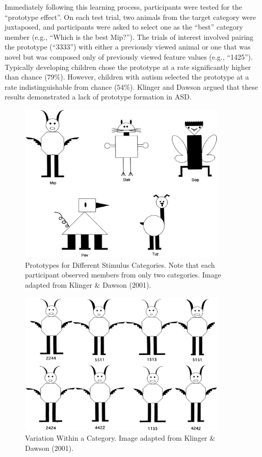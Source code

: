 Immediately following this learning process, participants were tested for the ``prototype effect''. On each test trial, two animals from the target category were juxtaposed, and participants were asked to select one as the ``best'' category member (e.g., ``Which is the best Mip?''). The trials of interest involved pairing the prototype (``3333'') with either a previously viewed animal or one that was novel but was composed only of previously viewed feature values (e.g., ``1425''). Typically developing children chose the prototype at a rate significantly higher than chance ($79\%$). However, children with autism selected the prototype at a rate indistinguishable from chance ($54\%$).
Klinger and Dawson argued that these results demonstrated a lack of prototype formation in ASD.

\begin{figure}[ht]
\begin{center}
	\includegraphics[width=100mm]{figures/prototype_categories.eps}
\end{center}
\caption{Prototypes for Different Stimulus Categories. Note that each participant observed members from only two categories. Image adapted from Klinger \& Dawson (2001).}
\label{prototype-categories}
\end{figure} 

\begin{figure}[ht]
\begin{center}
	\includegraphics[width=100mm]{figures/mip_familiarization.eps}
\end{center}
\caption{Variation Within a Category. Image adapted from Klinger \& Dawson (2001).}
\label{mip-familiarization}
\end{figure} 

